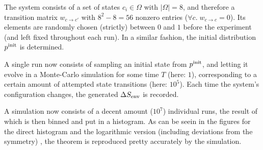The system consists of a set of states \(c_i\in\Omega\) with \(|\Omega| = 8\), and therefore a transition matrix \(w_{c\to c'}\) with \(8^2-8 = 56\) nonzero entries (\(\forall c.\;w_{c\to c} = 0\)). Its elements are randomly chosen (strictly) between \(0\) and \(1\) before the experiment (and left fixed throughout each run). In a similar fashion, the initial distribution \(p^{\text{init}}\) is determined.

A single run now consists of sampling an initial state from \(p^{\text{init}}\), and letting it evolve in a Monte-Carlo simulation for some time \(T\) (here: \(1\)), corresponding to a certain amount of attempted state transitions (here: \(10^5\)). Each time the system's configuration changes, the generated \(\Delta S_\text{env}\) is recorded.

A simulation now consists of a decent amount (\(10^7\)) individual runs, the result of which is then binned and put in a histogram. As can be seein in the figures for the direct histogram  and the logarithmic version (including deviations from the symmetry) , the theorem is reproduced pretty accurately by the simulation.

